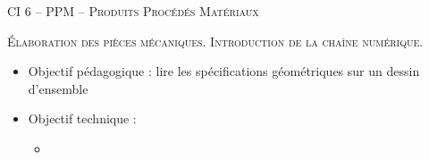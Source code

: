 \documentclass[11pt,oneside]{article}
\begin{document}
\pagestyle{fancy}
\renewcommand{\headrulewidth}{0pt}

\fancyhead{}

\fancyhead[C]{\rule{12cm}{.5pt}}


\renewcommand{\footrulewidth}{0.2pt}

\fancyfoot[C]{\footnotesize{\bfseries \thepage}}



\begin{center}
 \huge\textsc{CI 6 -- PPM -- Produits Procédés Matériaux}

 \large\textsc{Élaboration des pièces mécaniques. Introduction de la chaîne numérique.}
\end{center}



\vspace{.5cm}




\begin{contexte}
\begin{itemize}
\item Objectif pédagogique : lire les spécifications géométriques sur un dessin d'ensemble
\item Objectif technique : 
\begin{itemize}
\item %
\end{itemize}
\end{itemize}
\end{contexte}
\end{document}
